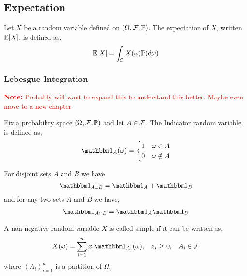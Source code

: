 \documentclass[12pt]{article}
\newcommand{\note}[1]{\textcolor{red}{\textbf{Note:} #1}}
\begin{document}
\subsection{Expectation}
\begin{definition}[Expectation]
Let \( X \) be a random variable defined on \( (\Omega, \mathcal{F}, \mathbb{P}) \). The expectation of \( X \), written \( \mathbb{E}[ X ] \), is defined as,
\begin{align*}
    \mathbb{E}[ X ] = \int_\Omega X(\omega) \mathbb{P}(\mathrm{d} \omega)
\end{align*}
\end{definition}


\subsubsection{Lebesgue Integration}

\note{Probably will want to expand this to understand this better. Maybe even move to a new chapter}

\begin{definition}
Fix a probability space \( (\Omega, \mathcal{F}, \mathbb{P}) \) and let \( A\in \mathcal{F} \). The Indicator random variable is defined as,
\begin{align*}
    \bOne_A(\omega) = \begin{cases}
        1 & \omega \in A \\
        0 & \omega \notin A
    \end{cases}
\end{align*}
\end{definition}

For disjoint sets \( A \) and \( B \) we have
\begin{align*}
    \bOne_{A\cup B} = \bOne_A + \bOne_B
\end{align*}
and for any two sets \( A \) and \( B \) we have,
\begin{align*}
    \bOne_{A\cap B} = \bOne_A \bOne_B
\end{align*}

\begin{definition}
A non-negative random variable \( X \) is called simple if it can be written as,
\begin{align*}
    X(\omega) = \sum_{i=1}^{n} x_i \bOne_{A_i}(\omega), && x_i \geq 0, && A_i\in \cF
\end{align*}
where \( (A_i)_{i=1}^{n} \) is a partition of \( \Omega \).
\end{definition}
\end{document}
